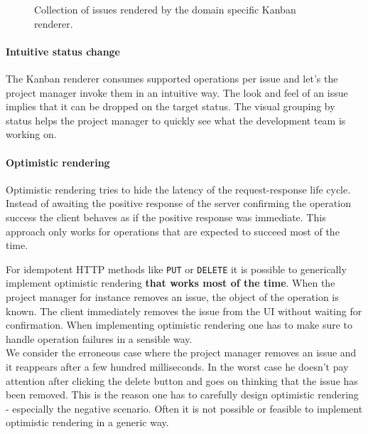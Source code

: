 \begin{figure}[!htb]
  \caption{Collection of issues rendered by the domain specific Kanban renderer.}
  \label{fig:issueshydra}
\end{figure}

\paragraph{Intuitive status change}
The Kanban renderer consumes supported operations per issue and let's the project manager invoke them in an intuitive way. The look and feel of an issue implies that it can be dropped on the target status. The visual grouping by status helps the project manager to quickly see what the development team is working on.

\paragraph{Optimistic rendering}
Optimistic rendering tries to hide the latency of the request-response life cycle. Instead of awaiting the positive response of the server confirming the operation success the client behaves as if the positive response was immediate. This approach only works for operations that are expected to succeed most of the time.

For idempotent HTTP methods like \lstinline{PUT} or \lstinline{DELETE} it is possible to generically implement optimistic rendering \textbf{that works most of the time}. When the project manager for instance removes an issue, the object of the operation is known. The client immediately removes the issue from the UI without waiting for confirmation. When implementing optimistic rendering one has to make sure to handle operation failures in a sensible way. \\
We consider the erroneous case where the project manager removes an issue and it reappears after a few hundred milliseconds. In the worst case he doesn't pay attention after clicking the delete button and goes on thinking that the issue has been removed. This is the reason one has to carefully design optimistic rendering - especially the negative scenario. Often it is not possible or feasible to implement optimistic rendering in a generic way.

